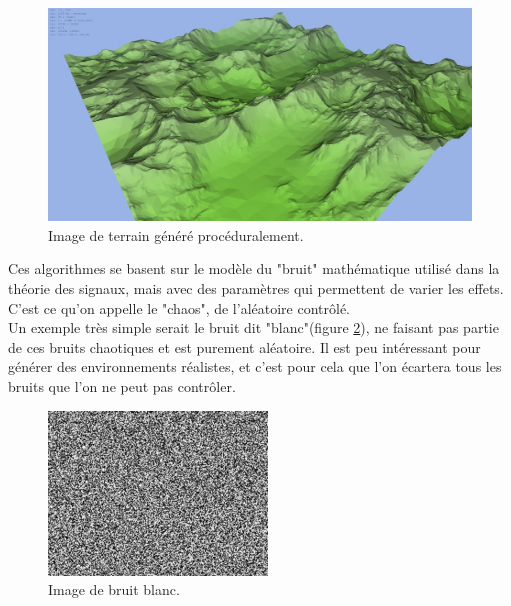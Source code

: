 \documentclass[a4paper]{article}
\begin{document}
    \begin{figure}[!ht]
        \begin{center} \includegraphics[width=0.8\linewidth]{img/landscape.jpg} \end{center}
        \caption{\label{figure5}Image de terrain généré procéduralement\protect\footnotemark .}
    \end{figure}
            
        
    Ces algorithmes se basent sur le modèle du "bruit" mathématique utilisé dans la théorie des signaux, mais avec des paramètres qui permettent de varier les effets. C'est ce qu'on appelle le "chaos", de l'aléatoire contrôlé.\\
    Un exemple très simple serait le bruit dit "blanc"(figure \ref{whitenoise}), ne faisant pas partie de ces bruits chaotiques et est purement aléatoire. Il est peu intéressant pour générer des environnements réalistes, et c'est pour cela que l'on écartera tous les bruits que l'on ne peut pas contrôler.\\
    
        \begin{figure}[!ht]
        \begin{center} \includegraphics[width=0.4\linewidth]{img/noise/whitenoise.png} \end{center}
        \caption{\label{whitenoise}Image de bruit blanc\protect\footnotemark .}
        \end{figure}
            
\end{document}
